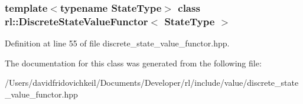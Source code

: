 \subsubsection*{template$<$typename State\+Type$>$\newline
class rl\+::\+Discrete\+State\+Value\+Functor$<$ State\+Type $>$}



Definition at line 55 of file discrete\+\_\+state\+\_\+value\+\_\+functor.\+hpp.



The documentation for this class was generated from the following file\+:\begin{DoxyCompactItemize}
\item 
/\+Users/davidfridovichkeil/\+Documents/\+Developer/rl/include/value/discrete\+\_\+state\+\_\+value\+\_\+functor.\+hpp\end{DoxyCompactItemize}
